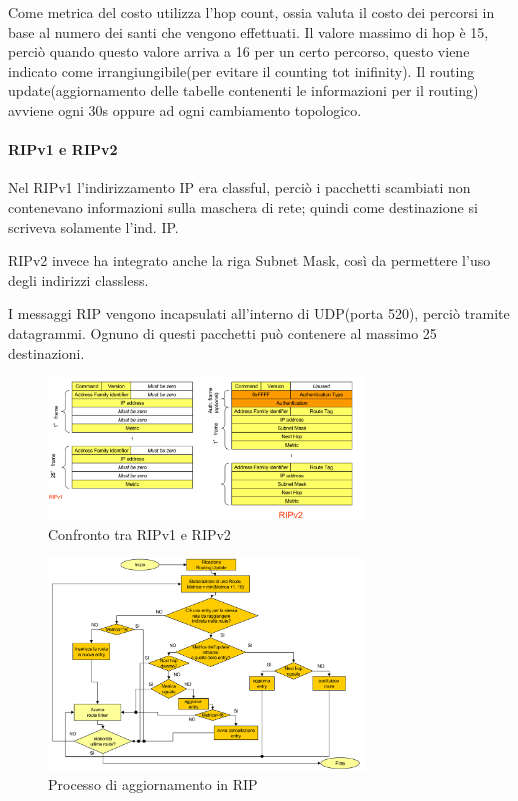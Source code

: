 Come metrica del costo utilizza l'hop count, ossia valuta il costo dei percorsi in base al numero dei santi che vengono effettuati.
Il valore massimo di hop è 15, perciò quando questo valore arriva a 16 per un certo percorso, questo viene indicato come irrangiungibile(per evitare il counting tot inifinity).
Il routing update(aggiornamento delle tabelle contenenti le informazioni per il routing) avviene ogni 30s oppure ad ogni cambiamento topologico.

\paragraph{RIPv1 e RIPv2}

 Nel RIPv1 l'indirizzamento IP era classful, perciò i pacchetti scambiati non contenevano informazioni sulla maschera di rete; quindi come destinazione si scriveva solamente l'ind. IP.

 RIPv2 invece ha integrato anche la riga Subnet Mask, così da permettere l'uso degli indirizzi classless. 

 I messaggi RIP vengono incapsulati all'interno di UDP(porta 520), perciò tramite datagrammi. Ognuno di questi pacchetti può contenere al massimo 25 destinazioni.

\begin{figure}[h!]
    \centering
    \includegraphics[width=0.75\textwidth]{images/RIPversioni.png}
    \caption{Confronto tra RIPv1 e RIPv2}
    \label{fig:ripversioni}
\end{figure}

\begin{figure}[h!]
    \centering
    \includegraphics[width=0.75\textwidth]{images/processoRIP.png}
    \caption{Processo di aggiornamento in RIP}
    \label{fig:processoRIP}
\end{figure}
\newpage
